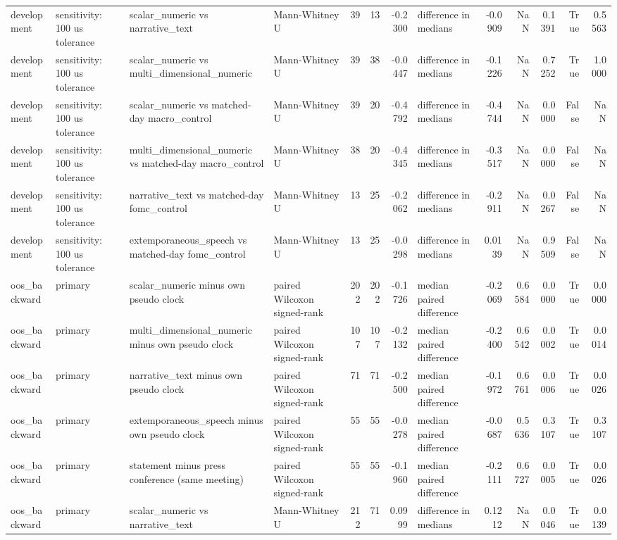 \begin{tabular}{llllrrrlrrrrr}
development & sensitivity: 100 us tolerance & scalar_numeric vs narrative_text & Mann-Whitney U & 39 & 13 & -0.2300 & difference in medians & -0.0909 & NaN & 0.1391 & True & 0.5563 \\
development & sensitivity: 100 us tolerance & scalar_numeric vs multi_dimensional_numeric & Mann-Whitney U & 39 & 38 & -0.0447 & difference in medians & -0.1226 & NaN & 0.7252 & True & 1.0000 \\
development & sensitivity: 100 us tolerance & scalar_numeric vs matched-day macro_control & Mann-Whitney U & 39 & 20 & -0.4792 & difference in medians & -0.4744 & NaN & 0.0000 & False & NaN \\
development & sensitivity: 100 us tolerance & multi_dimensional_numeric vs matched-day macro_control & Mann-Whitney U & 38 & 20 & -0.4345 & difference in medians & -0.3517 & NaN & 0.0000 & False & NaN \\
development & sensitivity: 100 us tolerance & narrative_text vs matched-day fomc_control & Mann-Whitney U & 13 & 25 & -0.2062 & difference in medians & -0.2911 & NaN & 0.0267 & False & NaN \\
development & sensitivity: 100 us tolerance & extemporaneous_speech vs matched-day fomc_control & Mann-Whitney U & 13 & 25 & -0.0298 & difference in medians & 0.0139 & NaN & 0.9509 & False & NaN \\
oos_backward & primary & scalar_numeric minus own pseudo clock & paired Wilcoxon signed-rank & 202 & 202 & -0.1726 & median paired difference & -0.2069 & 0.6584 & 0.0000 & True & 0.0000 \\
oos_backward & primary & multi_dimensional_numeric minus own pseudo clock & paired Wilcoxon signed-rank & 107 & 107 & -0.2132 & median paired difference & -0.2400 & 0.6542 & 0.0002 & True & 0.0014 \\
oos_backward & primary & narrative_text minus own pseudo clock & paired Wilcoxon signed-rank & 71 & 71 & -0.2500 & median paired difference & -0.1972 & 0.6761 & 0.0006 & True & 0.0026 \\
oos_backward & primary & extemporaneous_speech minus own pseudo clock & paired Wilcoxon signed-rank & 55 & 55 & -0.0278 & median paired difference & -0.0687 & 0.5636 & 0.3107 & True & 0.3107 \\
oos_backward & primary & statement minus press conference (same meeting) & paired Wilcoxon signed-rank & 55 & 55 & -0.1960 & median paired difference & -0.2111 & 0.6727 & 0.0005 & True & 0.0026 \\
oos_backward & primary & scalar_numeric vs narrative_text & Mann-Whitney U & 212 & 71 & 0.0999 & difference in medians & 0.1212 & NaN & 0.0046 & True & 0.0139 \\

\end{tabular}
